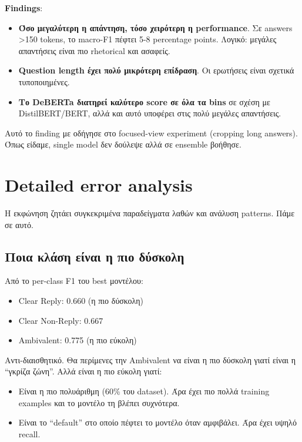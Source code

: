 \documentclass[12pt]{fphw}
\begin{document}
\textbf{Findings}:
\begin{itemize}
    \item \textbf{Όσο μεγαλύτερη η απάντηση, τόσο χειρότερη η performance}. Σε answers >150 tokens, το macro-F1 πέφτει 5-8 percentage points. Λογικό: μεγάλες απαντήσεις είναι πιο rhetorical και ασαφείς.
    \item \textbf{Question length έχει πολύ μικρότερη επίδραση}. Οι ερωτήσεις είναι σχετικά τυποποιημένες.
    \item \textbf{Το DeBERTa διατηρεί καλύτερο score σε όλα τα bins} σε σχέση με DistilBERT/BERT, αλλά και αυτό υποφέρει στις πολύ μεγάλες απαντήσεις.
\end{itemize}

Αυτό το finding με οδήγησε στο focused-view experiment (cropping long answers). Όπως είδαμε, single model δεν δούλεψε αλλά σε ensemble βοήθησε.

\section{Detailed error analysis}

Η εκφώνηση ζητάει συγκεκριμένα παραδείγματα λαθών και ανάλυση patterns. Πάμε σε αυτό.

\subsection{Ποια κλάση είναι η πιο δύσκολη}

Από το per-class F1 του best μοντέλου:
\begin{itemize}
    \item Clear Reply: 0.660 (η πιο δύσκολη)
    \item Clear Non-Reply: 0.667
    \item Ambivalent: 0.775 (η πιο εύκολη)
\end{itemize}

Αντι-διαισθητικό. Θα περίμενες την Ambivalent να είναι η πιο δύσκολη γιατί είναι η ``γκρίζα ζώνη''. Αλλά είναι η πιο εύκολη γιατί:

\begin{itemize}
    \item Είναι η πιο πολυάριθμη (60\% του dataset). Άρα έχει πιο πολλά training examples και το μοντέλο τη βλέπει συχνότερα.
    \item Είναι το ``default'' στο οποίο πέφτει το μοντέλο όταν αμφιβάλει. Άρα έχει υψηλό recall.
\end{itemize}
\end{document}
